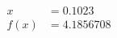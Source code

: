 \documentclass[preview]{standalone}
\begin{document}
\begin{align*}
x &= 0.1023\\f(x) &= 4.1856708
\end{align*}
\end{document}
